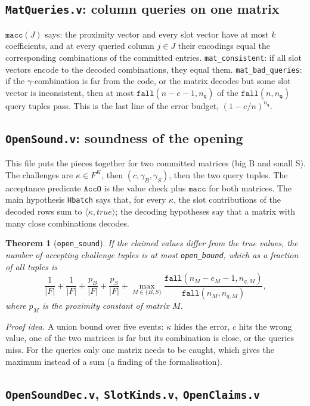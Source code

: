 \documentclass[11pt,a4paper]{article}
\newcommand{\ip}[2]{\langle #1, #2\rangle}
\newcommand{\nq}{n_{\mathsf{q}}}
\theoremstyle{definition}
\theoremstyle{plain}
\newtheorem{theorem}[definition]{Theorem}
\begin{document}
\subsection{\texttt{MatQueries.v}: column queries on one matrix}

$\mathtt{macc}(J)$ says: the proximity vector and every slot vector have at most $k$ coefficients, and at
every queried column $j\in J$ their encodings equal the corresponding combinations of the committed
entries. \texttt{mat\_consistent}: if all slot vectors encode to the decoded combinations, they equal
them. \texttt{mat\_bad\_queries}: if the $\gamma$-combination is far from the code, or the matrix
decodes but some slot vector is inconsistent, then at most $\mathtt{fall}(n-e-1,\nq)$ of the
$\mathtt{fall}(n,\nq)$ query tuples pass. This is the last line of the error budget,
$(1-e/n)^{\nq}$.

\subsection{\texttt{OpenSound.v}: soundness of the opening}

This file puts the pieces together for two committed matrices (big B and small S). The challenges
are $\kappa\in F^K$, then $(c,\gamma_B,\gamma_S)$, then the two query tuples. The acceptance
predicate $\mathtt{AccO}$ is the value check plus $\mathtt{macc}$ for both matrices. The main hypothesis
\texttt{Hbatch} says that, for every $\kappa$, the slot contributions of the decoded rows sum to
$\ip{\kappa}{\mathit{true}}$; the decoding hypotheses say that a matrix with many close combinations
decodes.
\begin{theorem}[\texttt{open\_sound}]
If the claimed values differ from the true values, the number of accepting challenge tuples is at
most \texttt{open\_bound}, which as a fraction of all tuples is
\[
  \frac1{|F|}+\frac1{|F|}+\frac{p_B}{|F|}+\frac{p_S}{|F|}
  +\max_{M\in\{B,S\}}\frac{\mathtt{fall}(n_M-e_M-1,n_{q,M})}{\mathtt{fall}(n_M,n_{q,M})},
\]
where $p_M$ is the proximity constant of matrix $M$.
\end{theorem}
\emph{Proof idea.} A union bound over five events: $\kappa$ hides the error, $c$ hits the wrong
value, one of the two matrices is far but its combination is close, or the queries miss. For the
queries only one matrix needs to be caught, which gives the maximum instead of a sum (a finding of
the formalisation).

\subsection{\texttt{OpenSoundDec.v}, \texttt{SlotKinds.v}, \texttt{OpenClaims.v}}
\end{document}
